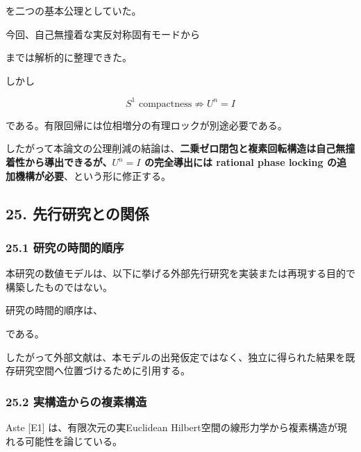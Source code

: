 \documentclass[
  a4paper,
]{ltjsarticle}
\begin{document}
を二つの基本公理としていた。

今回、自己無撞着な実反対称固有モードから

\begin{center}\end{center}

までは解析的に整理できた。

しかし

\[
S^1\text{ compactness}\not\Rightarrow U^n=I
\]

である。有限回帰には位相増分の有理ロックが別途必要である。

したがって本論文の公理削減の結論は、\textbf{二乗ゼロ閉包と複素回転構造は自己無撞着性から導出できるが、\(U^n=I\)
の完全導出には rational phase locking
の追加機構が必要}、という形に修正する。

\subsection{25.
先行研究との関係}\label{ux5148ux884cux7814ux7a76ux3068ux306eux95a2ux4fc2}

\subsubsection{25.1
研究の時間的順序}\label{ux7814ux7a76ux306eux6642ux9593ux7684ux9806ux5e8f}

本研究の数値モデルは、以下に挙げる外部先行研究を実装または再現する目的で構築したものではない。

研究の時間的順序は、

\begin{center}\end{center}

である。

したがって外部文献は、本モデルの出発仮定ではなく、独立に得られた結果を既存研究空間へ位置づけるために引用する。

\subsubsection{25.2
実構造からの複素構造}\label{ux5b9fux69cbux9020ux304bux3089ux306eux8907ux7d20ux69cbux9020}

Aste {[}E1{]} は、有限次元の実Euclidean
Hilbert空間の線形力学から複素構造が現れる可能性を論じている。
\end{document}
